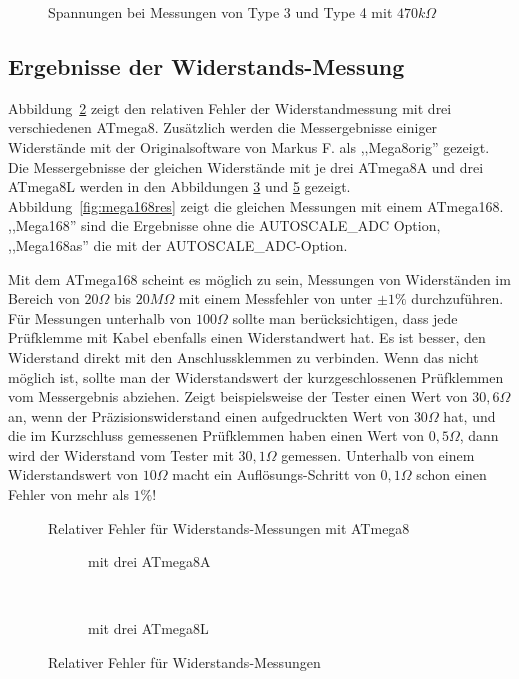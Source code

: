 \begin{figure}[H]
\centering

\caption{Spannungen bei Messungen von Type 3 und Type 4  mit \(470k\Omega\) }
\label{fig:RHv}
\end{figure}

\subsection{Ergebnisse der Widerstands-Messung}
Abbildung~\ref{fig:mega8res} zeigt den relativen Fehler der Widerstandmessung mit drei verschiedenen ATmega8. 
Zusätzlich werden die Messergebnisse einiger Widerstände mit der Originalsoftware von Markus F. als
,,Mega8orig'' gezeigt.
Die Messergebnisse der gleichen Widerstände mit je drei ATmega8A und drei ATmega8L werden in den Abbildungen
\ref{fig:mega8Ares} und \ref{fig:mega8Lres} gezeigt.
Abbildung~\ref{fig:mega168res} zeigt die gleichen Messungen mit einem ATmega168.
,,Mega168'' sind die Ergebnisse ohne die AUTOSCALE\_ADC Option, ,,Mega168as'' die mit der
 AUTOSCALE\_ADC-Option.

Mit dem ATmega168 scheint es möglich zu sein, Messungen von Widerständen im
Bereich von \(20\Omega\) bis \(20M\Omega\) mit einem Messfehler von unter \(\pm1\%\) durchzuführen.
Für Messungen unterhalb von \(100\Omega\) sollte man berücksichtigen, dass jede Prüfklemme mit Kabel ebenfalls
einen Widerstandwert hat.
Es ist besser, den Widerstand direkt mit den Anschlussklemmen zu verbinden.
Wenn das nicht möglich ist, sollte man der Widerstandswert der kurzgeschlossenen Prüfklemmen vom Messergebnis abziehen.
Zeigt beispielsweise der Tester einen Wert von \(30,6\Omega\) an, wenn der Präzisionswiderstand einen aufgedruckten Wert von \(30\Omega\) hat, 
und die im Kurzschluss gemessenen Prüfklemmen haben einen Wert von \(0,5\Omega\), dann wird der Widerstand vom
Tester mit \(30,1\Omega\) gemessen.
Unterhalb von einem Widerstandswert von \(10\Omega\) macht ein Auflösungs-Schritt von \(0,1\Omega\) schon einen Fehler von mehr als \(1\%\)!

\begin{figure}[H]
\centering

\caption{Relativer Fehler für Widerstands-Messungen mit ATmega8 }
\label{fig:mega8res}
\end{figure}

\begin{figure}[H]
  \begin{subfigure}[b]{9cm}
    \centering
    \resizebox{9cm}{!}{}
    \caption{mit drei ATmega8A}
    \label{fig:mega8Ares}
  \end{subfigure}
  ~
  \begin{subfigure}[b]{9cm}
    \centering
    \resizebox{9cm}{!}{}
    \caption{mit drei ATmega8L}
    \label{fig:mega8Lres}
  \end{subfigure}
\caption{Relativer Fehler für Widerstands-Messungen}
\end{figure}

